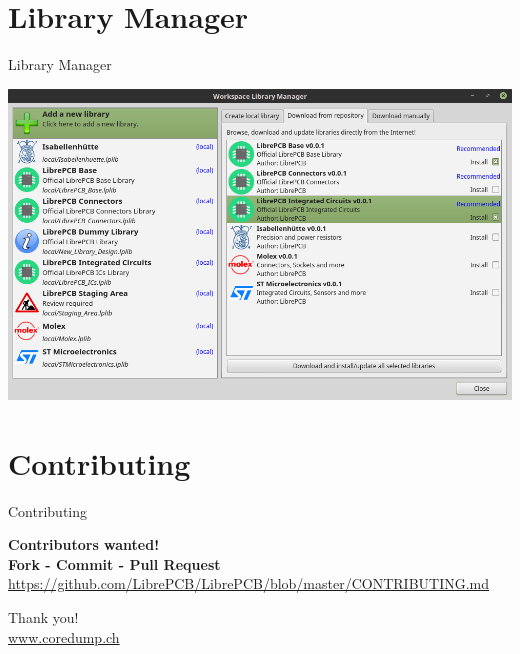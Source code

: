 \documentclass[aspectratio=1610,t]{beamer}
\begin{document}

\section{Library Manager}

\begin{frame}{Library Manager}
	\begin{center}
		\includegraphics[width=0.7\paperwidth]{images/library_manager.png}
	\end{center}
\end{frame}


\section{Contributing}

\begin{frame}{Contributing}
  \begin{centering}
    \bigskip \bigskip
    \textbf{\Huge Contributors wanted!}\\
    \bigskip \bigskip
    \textbf{\Large Fork - Commit - Pull Request}\\
    \bigskip \bigskip
    {\small \url{https://github.com/LibrePCB/LibrePCB/blob/master/CONTRIBUTING.md}}\\
  \end{centering}
\end{frame}


{
\begin{frame}[standout]
	\begin{centering}
	{\Huge Thank you!}\\
	{\normalsize \url{www.coredump.ch}}\\
	\end{centering}
\end{frame}
}
\end{document}
